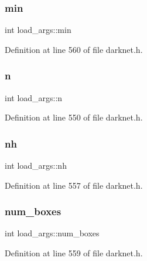 \mbox{\label{structload__args_a1dceb8bb209570cf9dd9fd5de36f206d}} 
\subsubsection{\texorpdfstring{min}{min}}
{\footnotesize\ttfamily int load\+\_\+args\+::min}



Definition at line 560 of file darknet.\+h.

\mbox{\label{structload__args_a46de5db87a3c8c05130d5b23a2cdea2f}} 
\subsubsection{\texorpdfstring{n}{n}}
{\footnotesize\ttfamily int load\+\_\+args\+::n}



Definition at line 550 of file darknet.\+h.

\mbox{\label{structload__args_a2a9063dbc5416dc01971bec6a3179a80}} 
\subsubsection{\texorpdfstring{nh}{nh}}
{\footnotesize\ttfamily int load\+\_\+args\+::nh}



Definition at line 557 of file darknet.\+h.

\mbox{\label{structload__args_ac8bdb2525a537b886829037122651101}} 
\subsubsection{\texorpdfstring{num\_boxes}{num\_boxes}}
{\footnotesize\ttfamily int load\+\_\+args\+::num\+\_\+boxes}



Definition at line 559 of file darknet.\+h.

\mbox{\label{structload__args_a46bfaa805648b12918b2fff4c66940c7}} 
